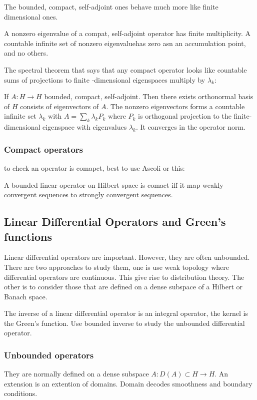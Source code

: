 \documentclass[main.tex]{subfiles}
\begin{document}
The bounded, compact, self-adjoint ones behave much more like finite dimensional ones. 

A nonzero eigenvalue of a compat, self-adjoint operator has finite multiplicity. A countable infinite set of nonzero eigenvaluehas zero asn an accumulation point, and no others.

The spectral theorem that says that any compact operator looks like countable sums of projections to finite -dimensional eigenspaces multiply by $\lambda_k$:

\begin{theorem}
If $A : H \rightarrow H$ bounded, compact, self-adjoint. Then there exists orthonormal basis of $H$ consists of eigenvectors of $A$. The nonzero eigenvectors forms a countable infinite set $\lambda_k$ with $A = \sum_k \lambda_k P_k$ where $P_k$ is orthogonal projection to the finite-dimensional eigenspace with eigenvalues $\lambda_k$. It converges in the operator norm.
\end{theorem}

\subsubsection{Compact operators}
to check an operator is comapct, best to use Ascoli or this:

\begin{theroem}
A bounded linear operator on Hilbert space is comact iff it map weakly convergent sequences to strongly convergent sequences.
\end{theroem}

\subsection{Linear Differential Operators and Green's functions}

Linear differential operators are important. However, they are often unbounded. There are two approaches to study them, one is use weak topology where differential operators are continuous. This give rise to distribution theory. The other is to consider those that are defined on a dense subspace of a Hilbert or Banach space. 

The inverse of a linear differential operator is an integral operator, the kernel is the Green's function. Use bounded inverse to study the unbounded differential operator. 

\subsubsection{Unbounded operators}
They are normally defined on a dense subspace $A: D(A) \subset H \rightarrow H$. An extension is an extention of domains. Domain decodes smoothness and boundary conditions.
\end{document}

